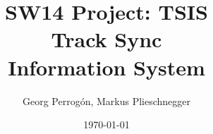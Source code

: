 \documentclass{beamer}
\title[Thema oder andere gleichbleibende Information]{SW14 Project: TSIS\\
Track Sync\\
Information System}
\author{Georg Perrogón, Markus Plieschnegger}
\date{\today}
\begin{document}
\titleframe






\end{document}
